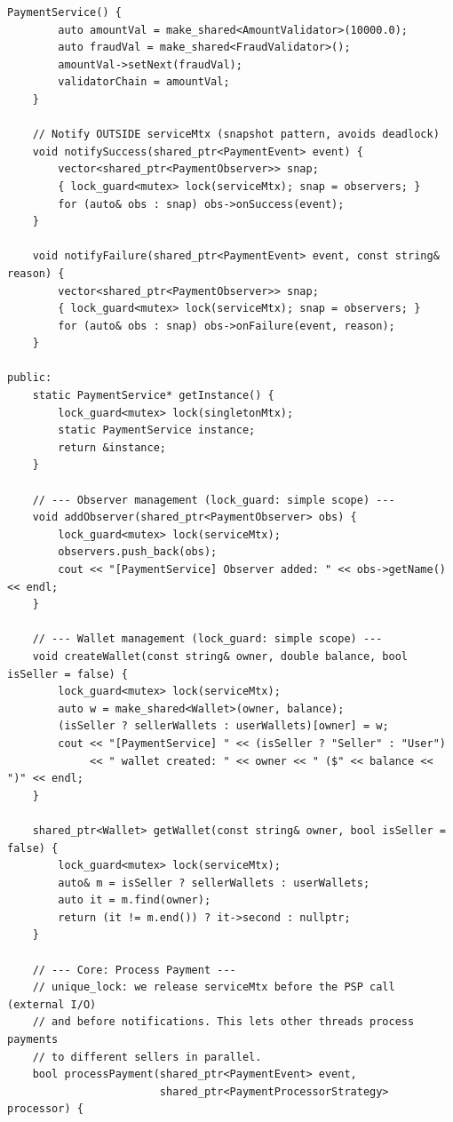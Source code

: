 \documentclass[11pt,a4paper]{article}
\begin{document}
\begin{lstlisting}[title={\texttt{managers.hpp}}]
    PaymentService() {
        auto amountVal = make_shared<AmountValidator>(10000.0);
        auto fraudVal = make_shared<FraudValidator>();
        amountVal->setNext(fraudVal);
        validatorChain = amountVal;
    }

    // Notify OUTSIDE serviceMtx (snapshot pattern, avoids deadlock)
    void notifySuccess(shared_ptr<PaymentEvent> event) {
        vector<shared_ptr<PaymentObserver>> snap;
        { lock_guard<mutex> lock(serviceMtx); snap = observers; }
        for (auto& obs : snap) obs->onSuccess(event);
    }

    void notifyFailure(shared_ptr<PaymentEvent> event, const string& reason) {
        vector<shared_ptr<PaymentObserver>> snap;
        { lock_guard<mutex> lock(serviceMtx); snap = observers; }
        for (auto& obs : snap) obs->onFailure(event, reason);
    }

public:
    static PaymentService* getInstance() {
        lock_guard<mutex> lock(singletonMtx);
        static PaymentService instance;
        return &instance;
    }

    // --- Observer management (lock_guard: simple scope) ---
    void addObserver(shared_ptr<PaymentObserver> obs) {
        lock_guard<mutex> lock(serviceMtx);
        observers.push_back(obs);
        cout << "[PaymentService] Observer added: " << obs->getName() << endl;
    }

    // --- Wallet management (lock_guard: simple scope) ---
    void createWallet(const string& owner, double balance, bool isSeller = false) {
        lock_guard<mutex> lock(serviceMtx);
        auto w = make_shared<Wallet>(owner, balance);
        (isSeller ? sellerWallets : userWallets)[owner] = w;
        cout << "[PaymentService] " << (isSeller ? "Seller" : "User")
             << " wallet created: " << owner << " ($" << balance << ")" << endl;
    }

    shared_ptr<Wallet> getWallet(const string& owner, bool isSeller = false) {
        lock_guard<mutex> lock(serviceMtx);
        auto& m = isSeller ? sellerWallets : userWallets;
        auto it = m.find(owner);
        return (it != m.end()) ? it->second : nullptr;
    }

    // --- Core: Process Payment ---
    // unique_lock: we release serviceMtx before the PSP call (external I/O)
    // and before notifications. This lets other threads process payments
    // to different sellers in parallel.
    bool processPayment(shared_ptr<PaymentEvent> event,
                        shared_ptr<PaymentProcessorStrategy> processor) {


\end{lstlisting}
\end{document}
